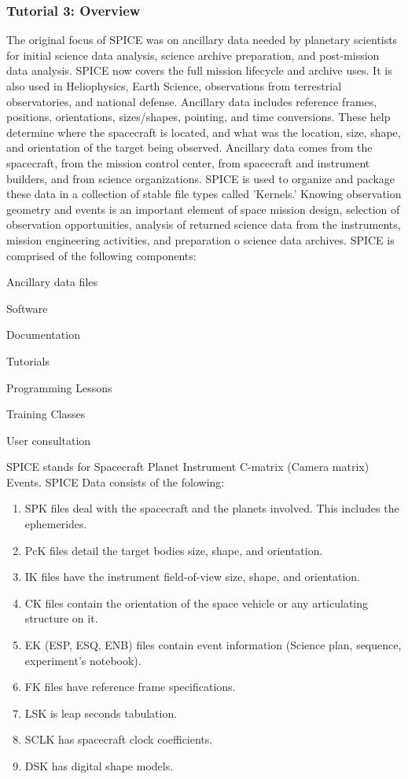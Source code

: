 \documentclass[crop=false,class=book]{standalone}
\begin{document}
\subsubsection{Tutorial 3: Overview}
The original focus of SPICE was on ancillary data needed by planetary scientists for initial science data analysis, science archive preparation, and post-mission data analysis. SPICE now covers the full mission lifecycle and archive uses. It is also used in Heliophysics, Earth Science, observations from terrestrial observatories, and national defense. Ancillary data includes reference frames, positions, orientations, sizes/shapes, pointing, and time conversions. These help determine where the spacecraft is located, and what was the location, size, shape, and orientation of the target being observed. Ancillary data comes from the spacecraft, from the mission control center, from spacecraft and instrument builders, and from science organizations. SPICE is used to organize and package these data in a collection of stable file types called 'Kernels.' Knowing observation geometry and events is an important element of space mission design, selection of observation opportunities, analysis of returned science data from the instruments, mission engineering activities, and preparation o science data archives. SPICE is comprised of the following components:
\begin{enumerate}
\begin{multicols}{3}
    \item Ancillary data files
    \item Software
    \item Documentation
    \item Tutorials
    \item Programming Lessons
    \item Training Classes
    \item User consultation
\end{multicols}
\end{enumerate}
SPICE stands for Spacecraft Planet Instrument C-matrix (Camera matrix) Events. SPICE Data consists of the folowing:
\begin{enumerate}
    \item SPK files deal with the spacecraft and the planets involved. This includes the ephemerides.
    \item PcK files detail the target bodies size, shape, and orientation.
    \item IK files have the instrument field-of-view size, shape, and orientation.
    \item CK files contain the orientation of the space vehicle or any articulating structure on it.
    \item EK (ESP, ESQ, ENB) files contain event information (Science plan, sequence, experiment's notebook).
    \item FK files have reference frame specifications.
    \item LSK is leap seconds tabulation.
    \item SCLK has spacecraft clock coefficients.
    \item DSK has digital shape models.
\end{enumerate}
\end{document}
